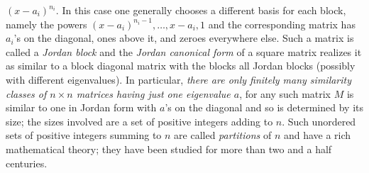 \documentclass[10pt]{article}
\begin{document}
$(x-a_i)^{n_i}$. In this case one generally chooses a different basis
for each block, namely the powers $(x-a_i)^{n_i-1},\ldots,x-a_i,1$ and
the corresponding matrix has $a_i$'s on the diagonal, ones above it, and
zeroes everywhere else. Such a matrix is called a {\sl Jordan block} and
the {\sl Jordan canonical form} of a square matrix realizes it as
similar to a block diagonal matrix with the blocks all Jordan blocks
(possibly with different eigenvalues). In particular, {\sl there are
  only finitely many similarity classes of $n\times n$ matrices having
  just one eigenvalue $a$}, for any such matrix $M$ is similar to one in
Jordan form with $a$'s on the diagonal and so is determined by its size;
the sizes involved are a set of positive integers adding to $n$. Such
unordered sets of positive integers summing to $n$ are called {\sl
  partitions} of $n$ and have a rich mathematical theory; they have been
studied for more than two and a half centuries.
\end{document}
